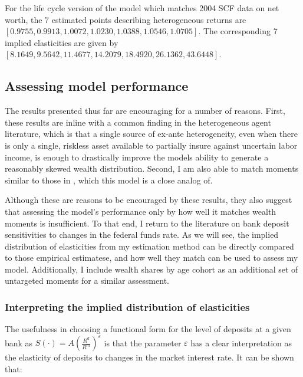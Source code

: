 \par For the life cycle version of the model which matches 2004 SCF data on net worth, the 7 estimated points describing heterogeneous returns are $[0.9755, 0.9913, 1.0072, 1.0230, 1.0388, 1.0546, 1.0705]$. The corresponding 7 implied elasticities are given by $[8.1649, 9.5642, 11.4677, 14.2079, 18.4920, 26.1362, 43.6448]$.

\subsection{Assessing model performance}

\par The results presented thus far are encouraging for a number of reasons. First, these results are inline with a common finding in the heterogeneous agent literature, which is that a single source of ex-ante heterogeneity, even when there is only a single, riskless asset available to partially insure against uncertain labor income, is enough to drastically improve the models ability to generate a reasonably skewed wealth distribution. Second, I am also able to match moments similar to those in \cite{cstw2017}, which this model is a close analog of.

\par Although these are reasons to be encouraged by these results, they also suggest that assessing the model's performance only by how well it matches wealth moments is insufficient. To that end, I return to the literature on bank deposit sensitivities to changes in the federal funds rate. As we will see, the implied distribution of elasticities from my estimation method can be directly compared to those empirical estimatese, and how well they match can be used to assess my model. Additionally, I include wealth shares by age cohort as an additional set of untargeted moments for a similar assessment.  

\subsubsection{Interpreting the implied distribution of elasticities}

\par The usefulness in choosing a functional form for the level of deposits at a given bank as $S(\cdot) = A \left( \frac{R^d}{R^m} \right)^{\varepsilon}$ is that the parameter $\varepsilon$ has a clear interpretation as the elasticity of deposits to changes in the market interest rate. It can be shown that:

